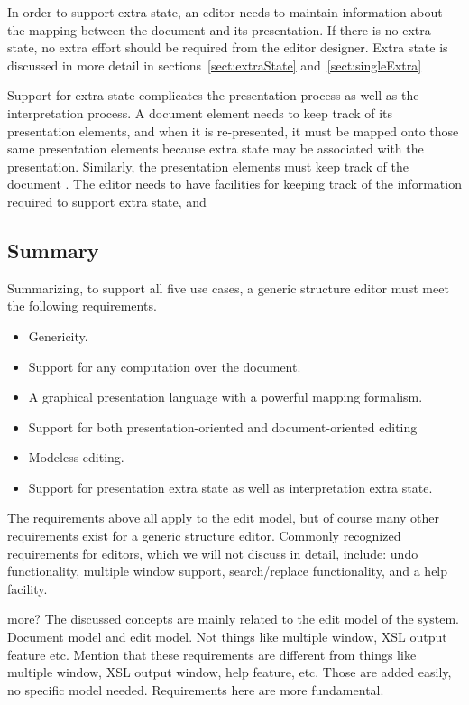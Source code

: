 \documentclass{entcs}
\begin{document}
In order to support extra state, an editor needs to maintain information about the mapping between the document and its presentation. If there is no extra state, no extra effort should be required from the editor designer. Extra state is discussed in more detail in sections~\ref{sect:extraState} and~\ref{sect:singleExtra}

\bc
Support for extra state complicates the presentation process as well as the interpretation process. A document element needs to keep track of its presentation elements, and when it is re-presented, it must be mapped onto those same presentation elements because extra state may be associated with the presentation. Similarly, the presentation elements must keep track of the document . The editor needs to have facilities for keeping track of the information required to support extra state, and
\ec


%																
\subsection{Summary}

Summarizing, to support all five use cases, a generic structure editor must meet the following requirements.

\begin{itemize}
\item Genericity.
\item Support for any computation over the document.
\item A graphical presentation language with a powerful mapping formalism.
\item Support for both presentation-oriented and document-oriented editing %
\item Modeless editing.
\item Support for presentation extra state as well as interpretation extra state.
\end{itemize}

The requirements above all apply to the edit model, but of course many other requirements exist for a generic structure editor.  Commonly recognized requirements for editors, which we will not discuss in detail, include: undo functionality, multiple window support, search/replace functionality, and a help facility. 

\bc
more?
The discussed concepts are mainly related to the edit model of the system. 
Document model and edit model. Not things like multiple window, XSL output feature etc.
Mention that these requirements are different from things like multiple window, XSL output window, help feature, etc. Those are added easily, no specific model needed. Requirements here are more fundamental.
\end{document}
